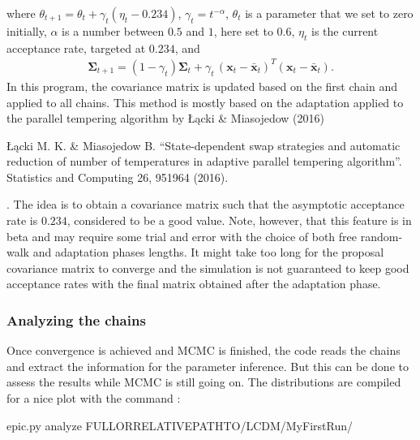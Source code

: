 \documentclass[letterpaper,12pt,english]{sphinxhowto}
\begin{document}
where \(\theta_{t+1} = \theta_{t} + \gamma_t \left( \eta_t - 0.234 \right)\),
\(\gamma_t = t^{-\alpha}\), \(\theta_t\) is a parameter that we set to
zero initially, \(\alpha\) is a number between \(0.5\) and \(1\),
here set to \(0.6\), \(\eta_t\) is the current acceptance rate,
targeted at \(0.234\), and
\begin{equation*}
\begin{split}\mathbf{\Sigma}_{t+1} = \left(1 - \gamma_t \right) \mathbf{\Sigma}_t + \gamma_t \, \left(\mathbf{x}_t - \mathbf{\bar{x}}_t\right)^T \left(\mathbf{x}_t - \mathbf{\bar{x}}_t\right).\end{split}
\end{equation*}
In this program, the covariance matrix is updated based on the first chain and
applied to all chains.
This method is mostly based on the adaptation applied to the parallel tempering
algorithm by Łącki \& Miasojedow (2016) %
\begin{footnote}[2]\sphinxAtStartFootnote
Łącki M. K. \& Miasojedow B. “State-dependent swap strategies and automatic reduction of number of temperatures in adaptive parallel tempering algorithm”. Statistics and Computing 26, 951\textendash{}964 (2016).
%
\end{footnote}.
The idea is to obtain a covariance matrix such that the asymptotic acceptance
rate is \(0.234\), considered to be a good value.
Note, however, that this feature is in beta and may require some trial and
error with the choice of both free random-walk and adaptation phases lengths.
It might take too long for the proposal covariance matrix to converge and
the simulation is not guaranteed to keep good acceptance rates with
the final matrix obtained after the adaptation phase.


\subsubsection{Analyzing the chains}
\label{\detokenize{MCMC:analyzing-the-chains}}
Once convergence is achieved and MCMC is finished, the code reads the chains
and extract the information for the parameter inference.
But this can be done to assess the results while MCMC is still going on.
The distributions are compiled for a nice plot with the command :

%
\begin{sphinxVerbatim}[commandchars=\\\{\}]
\PYGZdl{} epic.py analyze \PYGZlt{}FULL\PYGZhy{}OR\PYGZhy{}RELATIVE\PYGZhy{}PATH\PYGZhy{}TO\PYGZgt{}/LCDM/MyFirstRun/
\end{sphinxVerbatim}
\end{document}
